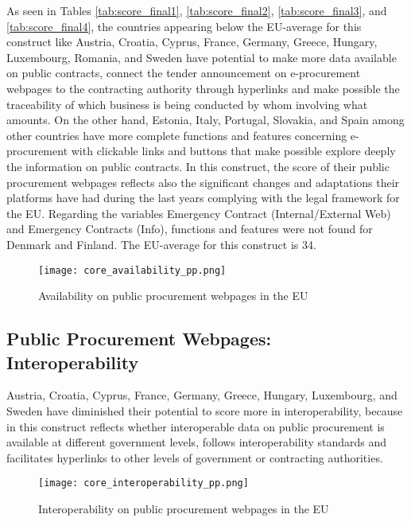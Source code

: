 \documentclass[a4paper, twoside]{report}
\begin{document}
As seen in Tables \ref{tab:score_final1}, \ref{tab:score_final2}, \ref{tab:score_final3}, and \ref{tab:score_final4}, the countries appearing below the EU-average for this construct like Austria, Croatia, Cyprus, France, Germany, Greece, Hungary, Luxembourg, Romania, and Sweden have potential to make more data available on public contracts, connect the tender announcement on e-procurement webpages to the contracting authority through hyperlinks and make possible the traceability of which business is being conducted by whom involving what amounts. On the other hand, Estonia, Italy, Portugal, Slovakia, and Spain among other countries have more complete functions and features concerning e-procurement with clickable links and buttons that make possible explore deeply the information on public contracts. In this construct, the score of their public procurement webpages reflects also the significant changes and adaptations their platforms have had during the last years complying with the legal framework for the EU. Regarding the variables Emergency Contract (Internal/External Web) and Emergency Contracts (Info), functions and features were not found for Denmark and Finland. The EU-average for this construct is 34.\\ 

\begin{figure}[H]
\centering
	\caption{Availability on public procurement webpages in the EU}
	\texttt{[image: core\_availability\_pp.png]}
	\label{fig:core_availability_pp}
\end{figure}

\subsection{Public Procurement Webpages: Interoperability}

Austria, Croatia, Cyprus, France, Germany, Greece, Hungary, Luxembourg, and Sweden have diminished their potential to score more in interoperability, because in this construct reflects whether interoperable data on public procurement is available at different government levels, follows interoperability standards and facilitates hyperlinks to other levels of government or contracting authorities.\\
\begin{figure}[H]
\centering
	\caption{Interoperability on public procurement webpages in the EU}
	\texttt{[image: core\_interoperability\_pp.png]}
	\label{fig:core_interoperability_pp}
\end{figure}
\end{document}
